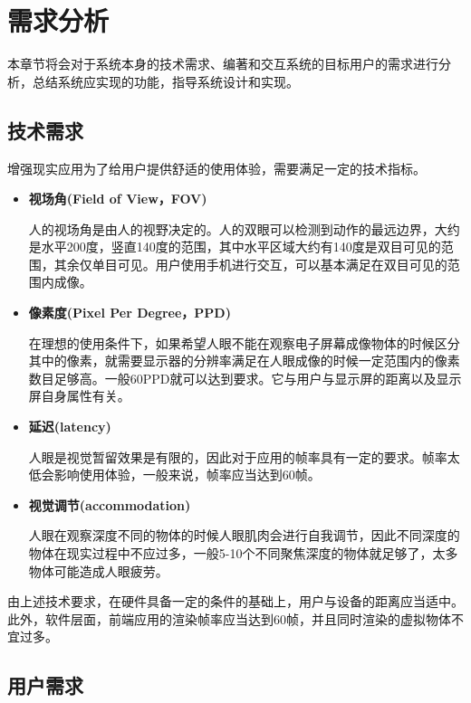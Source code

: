 \chapter{需求分析}
\label{requirement}

本章节将会对于系统本身的技术需求、编著和交互系统的目标用户的需求进行分析，总结系统应实现的功能，指导系统设计和实现。

\section{技术需求}
增强现实应用为了给用户提供舒适的使用体验，需要满足一定的技术指标。\cite{artech}

\begin{itemize}
    \item \textbf{视场角(Field of View，FOV)}
    
       人的视场角是由人的视野决定的。人的双眼可以检测到动作的最远边界，大约是水平200度，竖直140度的范围，其中水平区域大约有140度是双目可见的范围，其余仅单目可见。用户使用手机进行交互，可以基本满足在双目可见的范围内成像。
    
    \item \textbf{像素度(Pixel Per Degree，PPD)}
    
     在理想的使用条件下，如果希望人眼不能在观察电子屏幕成像物体的时候区分其中的像素，就需要显示器的分辨率满足在人眼成像的时候一定范围内的像素数目足够高。一般60PPD就可以达到要求。它与用户与显示屏的距离以及显示屏自身属性有关。
    
    \item \textbf{延迟(latency)}
    
      人眼是视觉暂留效果是有限的，因此对于应用的帧率具有一定的要求。帧率太低会影响使用体验，一般来说，帧率应当达到60帧。
    
    \item \textbf{视觉调节(accommodation)}
    
    人眼在观察深度不同的物体的时候人眼肌肉会进行自我调节，因此不同深度的物体在现实过程中不应过多，一般5-10个不同聚焦深度的物体就足够了，太多物体可能造成人眼疲劳。
\end{itemize}

\indent    	由上述技术要求，在硬件具备一定的条件的基础上，用户与设备的距离应当适中。此外，软件层面，前端应用的渲染帧率应当达到60帧，并且同时渲染的虚拟物体不宜过多。

\section{用户需求}


